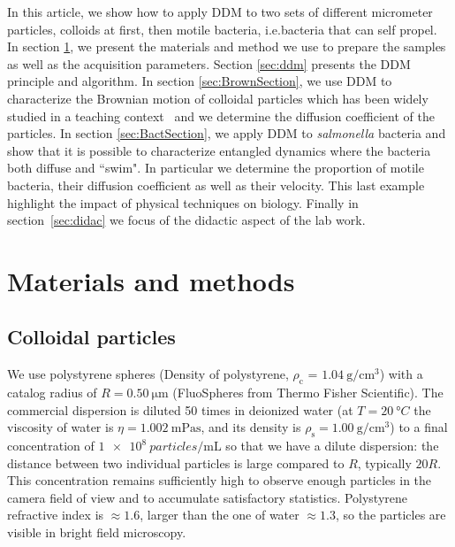 \documentclass[prb,reprint,amsmath,amssymb]{revtex4-1}
\newcommand{\tg}[1]{{\color{magenta}#1}} %
\begin{document}
In this article, we show how to apply DDM to two sets of different micrometer particles, colloids at first, then motile bacteria, \tg{i.e.bacteria that can self propel}. In section \ref{sec:materials}, we present the materials and method we use to prepare the samples as well as the acquisition parameters. \tg{Section \ref{sec:ddm} presents the DDM principle and algorithm}. In section \ref{sec:BrownSection}, we \tg{use DDM to characterize the Brownian motion of colloidal particles which has been widely studied in a teaching context~\cite{ajp1997lemons, ajp2006newburgh, ajp2006bergstein} and we determine the diffusion coefficient of the particles}. In section \ref{sec:BactSection}, we apply DDM to \textit{salmonella} bacteria and show that it is possible to characterize entangled dynamics where the bacteria both diffuse and ``swim". \tg{In particular we determine the proportion of motile bacteria, their diffusion coefficient as well as their velocity}. This last example highlight the impact of physical techniques on biology. Finally in section~\ref{sec:didac} we focus of the didactic aspect of the lab work.

\section{Materials and methods}
\label{sec:materials}
\subsection{Colloidal particles}

We use polystyrene spheres (Density of polystyrene, $\rho_\text{c}$ = $\SI{1.04}{\gram\per\centi\meter\cubed}$) with a catalog radius of $R=\SI{0.50}{\micro\meter}$  (FluoSpheres\circledR{} from Thermo Fisher Scientific). The commercial dispersion is diluted 50 times in \tg{deionized} water \tg{(at $T=\SI{20}{\degree C}$ the viscosity of water is $\eta =\SI{1.002}{\milli\pascal\second}$, and its density is $\rho_\text{s}=\SI{1.00}{\gram\per\centi\meter\cubed}$)} to a final concentration of $\SI{1e8}{particles\per\milli\liter}$ so that we have a dilute dispersion: \tg{the distance between two individual particles} is large compared to $R$, typically $20 R$. This concentration remains sufficiently high to observe enough particles in the camera field of view and to \tg{accumulate satisfactory statistics}. Polystyrene refractive index is $\approx 1.6$, larger than the one of water $\approx 1.3$, so the particles are visible in bright field microscopy.
\end{document}

